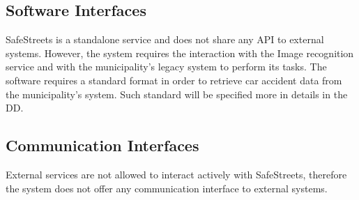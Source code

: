 \subsection{Software Interfaces}
SafeStreets is a standalone service and does not share any API to 
external systems. However, the system requires the interaction with the Image recognition service and with the municipality's legacy system to perform its tasks. The software requires a standard format in order to retrieve car accident
data from the municipality's system. Such standard will be specified more in details in the DD.
\subsection{Communication Interfaces}
External services are not allowed to interact actively with SafeStreets, therefore the system does not offer any communication interface to external systems.
